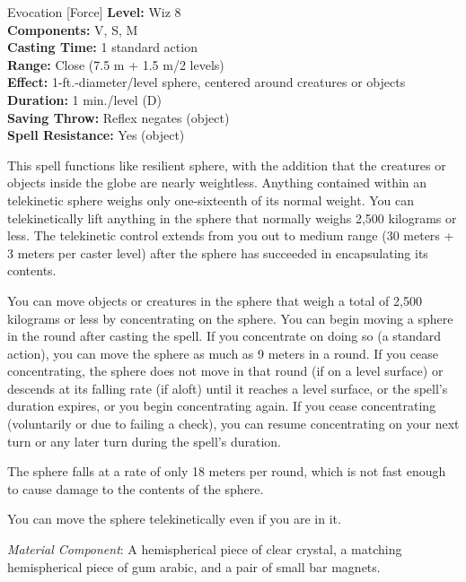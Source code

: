 {Evocation [Force]}
{
	\textbf{Level:}
	Wiz 8\\
	\textbf{Components:}
	V, S, M\\
	\textbf{Casting Time:}
	1 standard action\\
	\textbf{Range:}
	Close (7.5 m + 1.5 m/2 levels)\\
	\textbf{Effect:}
	1-ft.-diameter/level sphere, centered around creatures or objects\\
	\textbf{Duration:}
	1 min./level (D)\\
	\textbf{Saving Throw:}
	Reflex negates (object)\\
	\textbf{Spell Resistance:}
	Yes (object)\\
}
{
	This spell functions like resilient sphere, with the addition that the creatures or objects inside the globe are nearly weightless. Anything contained within an telekinetic sphere weighs only one-sixteenth of its normal weight. You can telekinetically lift anything in the sphere that normally weighs 2,500 kilograms or less. The telekinetic control extends from you out to medium range (30 meters + 3 meters per caster level) after the sphere has succeeded in encapsulating its contents.

	You can move objects or creatures in the sphere that weigh a total of 2,500 kilograms or less by concentrating on the sphere. You can begin moving a sphere in the round after casting the spell. If you concentrate on doing so (a standard action), you can move the sphere as much as 9 meters in a round. If you cease concentrating, the sphere does not move in that round (if on a level surface) or descends at its falling rate (if aloft) until it reaches a level surface, or the spell's duration expires, or you begin concentrating again. If you cease concentrating (voluntarily or due to failing a  check), you can resume concentrating on your next turn or any later turn during the spell's duration.

	The sphere falls at a rate of only 18 meters per round, which is not fast enough to cause damage to the contents of the sphere.

	You can move the sphere telekinetically even if you are in it.

	\textit{Material Component}:
	A hemispherical piece of clear crystal, a matching hemispherical piece of gum arabic, and a pair of small bar magnets.

}
